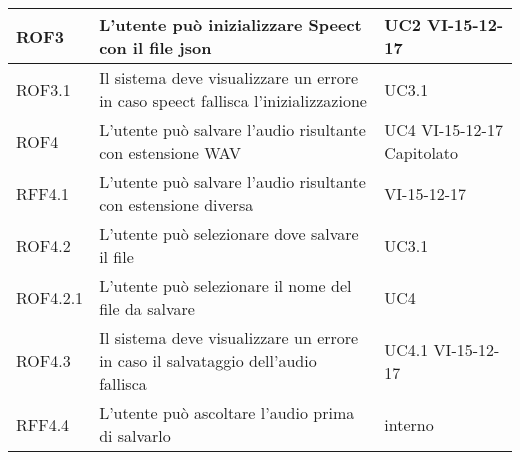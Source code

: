 \documentclass[../AnalisideiRequisiti.tex]{subfiles}
\begin{document}
\begin{longtable}{| p{3cm} | p{6cm} | p{3cm} |}
	
		\newline ROF3&
		\newline L'utente può inizializzare Speect con il file json&
		\newline UC2 \newline VI-15-12-17
		\\[1em]	
			\hline	
		
		\newline ROF3.1&
		\newline Il sistema deve visualizzare un errore in caso speect fallisca l'inizializzazione&
		\newline UC3.1
		\\[1em]		
		\hline
		
		\newline ROF4&
		\newline L'utente può salvare l'audio risultante con estensione WAV&
		\newline UC4 \newline VI-15-12-17 \newline Capitolato
		\\[1em]
			\hline
			
		\newline RFF4.1&
		\newline L'utente può salvare l'audio risultante con estensione diversa&
		\newline VI-15-12-17
		\\[1em]
		\hline
		
		\newline ROF4.2&
		\newline L'utente può selezionare dove salvare il file&
		\newline UC3.1 
		\\[1em]
		
		\hline	
		\newline ROF4.2.1&
		\newline L'utente può selezionare il nome del file da salvare&
		\newline UC4
		\\[1em]
		
		\hline
		\newline ROF4.3&
		\newline Il sistema deve visualizzare un errore in caso il salvataggio dell'audio fallisca&
		\newline UC4.1 \newline VI-15-12-17
		\\[1em]
		\hline
		
		\newline RFF4.4&
		\newline L'utente può ascoltare l'audio prima di salvarlo&
		\newline interno
		\\[1em]
		\hline
		

\end{longtable}
\end{document}
